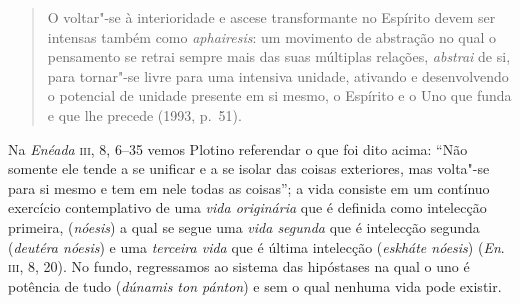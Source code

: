 {\begin{quote}
O voltar"-se à interioridade e ascese transformante no Espírito devem ser
intensas também como
\emph{aphairesis}: um
movimento de abstração no qual o pensamento se retrai sempre mais das
suas múltiplas relações,
\textit{abstrai} de si, para
tornar"-se livre para uma intensiva unidade, ativando e desenvolvendo o
potencial de unidade presente em si mesmo, o Espírito e o Uno que funda
e que lhe precede (1993, p.~51).
\end{quote}


  Na \emph{Enéada} \textsc{iii}, 8, 6--35 vemos Plotino referendar o que foi
dito acima: ``Não somente ele tende a se unificar e a se isolar
das coisas exteriores, mas volta"-se para si mesmo e tem em nele todas
as coisas''; a vida consiste em um contínuo exercício contemplativo de
uma \emph{vida originária} que é definida como intelecção primeira,
(\emph{nóesis}) a qual se segue uma \emph{vida segunda} que é
intelecção segunda (\emph{deutéra nóesis}) e uma \emph{terceira
vida} que é última intelecção (\emph{eskháte nóesis}) (\emph{En}.~%
\textsc{iii}, 8, 20). No fundo, regressamos ao sistema das hipóstases na qual o
uno é potência de tudo (\emph{dúnamis ton pánton}) e sem o qual
nenhuma vida pode existir.

}
